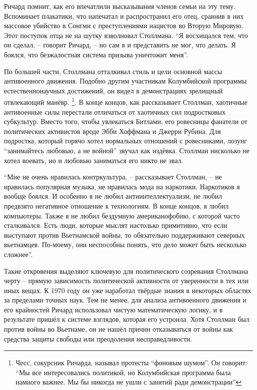 Ричард помнит, как его впечатлили высказывания членов семьи на эту тему. Вспоминает плакатики, что напечатал и распространил его отец, сравнив в них массовое убийство в Сонгми с преступлениями нацистов во Вторую Мировую. Этот поступок отца не на шутку взволновал Столлмана. \enquote{Я восхищался тем, что он сделал, -- говорит Ричард, -- но сам я и представить не мог, что делать. Я боялся, что безжалостная система призыва уничтожит меня}.

По большей части, Столлмана отталкивал стиль и цели основной массы антивоенного движения. Подобно другим участникам Колумбийской программы естественнонаучных достижений, он видел в демонстрациях зрелищный отвлекающий манёвр. \footnote{Чесс, сокурсник Ричарда, называл протесты \enquote{фоновым шумом}. Он говорит: \enquote{Мы все интересовались политикой, но Колумбийская программа была намного важнее. Мы бы никогда не ушли с занятий ради демонстрации}}. В конце концов, как рассказывает Столлман, хаотичные антивоенные силы перестали отличаться от хаотичных сил подростковых субкультур. Вместо того, чтобы увлекаться Битлами, его ровесницы фанатели от политических активистов вроде Эбби Хоффмана и Джерри Рубина. Для подростка, который горячо хотел нормальных отношений с ровесниками, лозунг \enquote{занимайтесь любовью, а не войной} звучал как издёвка. Столлман нисколько не хотел воевать, но и любовью заниматься его никто не звал.

\enquote{Мне не очень нравилась контркультура, -- рассказывает Столлман, -- не нравилась популярная музыка, не нравилась мода на наркотики. Наркотиков я вообще боялся. И особенно я не любил антиинтеллектуализм, не любил предвзято негативное отношение к технологиям. В конце концов, я любил компьютеры. Также я не любил бездумную американофобию, с которой часто сталкивался. Есть люди, которые мыслят настолько примитивно, что если выступают против Вьетнамской войны, то обязательно поддерживают северных вьетнамцев. По-моему, они неспособны понять, что дело может быть несколько сложнее}.

Такие откровения выделяют ключевую для политического созревания Столлмана черту -- прямую зависимость политической активности от уверенности в тех или иных вещах. К 1970 году он уже наработал твёрдые знания в некоторых областях за пределами точных наук. Тем не менее, для анализа антивоенного движения и его крайностей Ричард использовал чистую математическую логику, и в результате пришёл к системе взглядов, которая его устроила. Хотя Столлман был против войны во Вьетнаме, он не нашёл причин отказываться от войны как средства защиты свободы или преодоления несправедливости.

